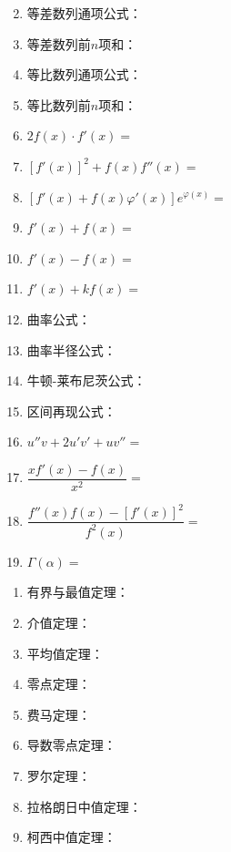 \documentclass[a4paper,12pt]{article}
\begin{document}
    \begin{minipage}[t]{0.38\textwidth}
        \begin{enumerate}[leftmargin=*, itemsep=1.4em]
            \setcounter{enumi}{1}
            \item 等差数列通项公式：
            \item 等差数列前$n$项和：
            \item 等比数列通项公式：
            \item 等比数列前$n$项和：
            \item $2f(x)\cdot f'(x) =$
            \item $[f'(x)]^2 + f(x)f''(x) = $
            \item $[f'(x) + f(x)\varphi'(x)]e^{\varphi(x)} = $
            \item $f'(x) + f(x) = $
            \item $f'(x) - f(x) =$
            \item $f'(x) + kf(x) = $
        \end{enumerate}
    \end{minipage}
    \hfill
    \begin{minipage}[t]{0.46\textwidth}
        \begin{enumerate}[leftmargin=*, itemsep=1.4em]
            \setcounter{enumi}{11}
            \item 曲率公式：
            \item 曲率半径公式：
            \item 牛顿-莱布尼茨公式：
            \item 区间再现公式：
            \item $u''v + 2u'v' + uv'' = $
            \item $\dfrac{xf'(x) - f(x)}{x^2} = $
            \item $\dfrac{f''(x)f(x) - [f'(x)]^2}{f^{2}(x)} = $
            \item $\Gamma(\alpha) = $
        \end{enumerate}
    \end{minipage}

    \vspace{1em}

    \begin{enumerate}[itemsep=1.8em]
        \item 有界与最值定理：
        \item 介值定理：
        \item 平均值定理：
        \item 零点定理：
        \item 费马定理：
        \item 导数零点定理：
        \item 罗尔定理：
        \item 拉格朗日中值定理：
        \item 柯西中值定理：
    \end{enumerate}
\end{document}
